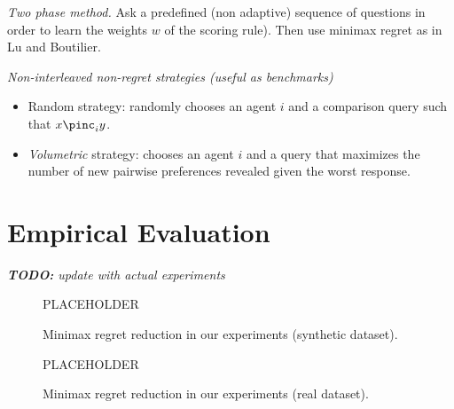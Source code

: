 \medskip \noindent
{\em Two phase method.}
Ask a predefined (non adaptive) sequence of questions in order to learn the weights $w$ of the scoring rule).
Then use minimax regret as in Lu and Boutilier.

\medskip \noindent
{\em Non-interleaved non-regret strategies (useful as benchmarks)}	
	\begin{itemize}
		\item Random strategy: randomly chooses an agent $i$ and a comparison query such that $x \pinc_i y$.
		\item {\em Volumetric} strategy: chooses an agent $i$ and a query that maximizes the number of new pairwise preferences revealed given the worst response.
	\end{itemize}


\section{Empirical Evaluation} \label{sec:experiments}

{\em {\bf TODO:} update with actual experiments}

\begin{figure}[t]
\begin{center}PLACEHOLDER\end{center}
\vspace{3.5cm}
\caption{Minimax regret reduction in our experiments (synthetic dataset).}
\end{figure}

\begin{figure}[t]
\begin{center}PLACEHOLDER\end{center}
\vspace{3.5cm}
\caption{Minimax regret reduction in our experiments (real dataset).}
\end{figure}

